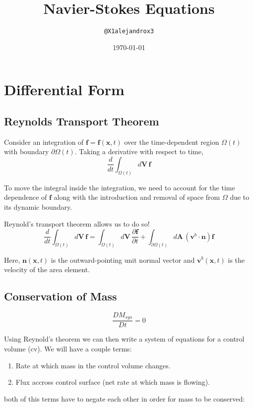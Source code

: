 \documentclass[10pt,a4paper,draft]{article}
\begin{document}
\title{Navier-Stokes Equations} 
\author{\texttt{@X1alejandrox3}} 
\date{\today}  
\maketitle


\section{Differential Form}

\subsection{Reynolds Transport Theorem}
Consider an integration of $\mathbf{f} = \mathbf{f}(\mathbf{x},t)$ over the time-dependent region $\Omega (t)$ with boundary $\partial \Omega(t)$.
Taking a derivative with respect to time,
$$
\frac{d}{dt} \int_{\Omega (t)} d\mathbf{V} \, \mathbf{f}
$$

To move the integral inside the integration, we need to account for the time dependence of $\mathbf{f}$ along with the introduction and removal of space from $\Omega$ due to its dynamic boundary.


Reynold's transport theorem allows us to do so!
$$
\frac{d}{d t} \int_{\Omega (t)} d\mathbf{V} \, \mathbf{f} 
= \int_{\Omega (t)} d\mathbf{V} \, \frac{\partial \mathbf{f}}{\partial t}
+ \int_{\partial \Omega (t)} d\mathbf{A} \, \left(\mathbf{v}^b \cdot \mathbf{n}\right) \mathbf{f}
$$

Here, $\mathbf{n}(\mathbf{x},t)$ is the outward-pointing unit normal vector and $\mathbf{v}^b(\mathbf{x},t)$ is the velocity of the area element.


\subsection{Conservation of Mass}
$$
\frac{D M_{sys}}{D t} = 0
$$

Using Reynold's theorem we can then write a system of equations for a control volume (cv).
We will have a couple terms: 
\begin{enumerate}
\item Rate at which mass in the control volume changes.
\item Flux accross control surface (net rate at which mass is flowing).
\end{enumerate}
both of this terms have to negate each other in order for mass to be conserved:
\end{document}
